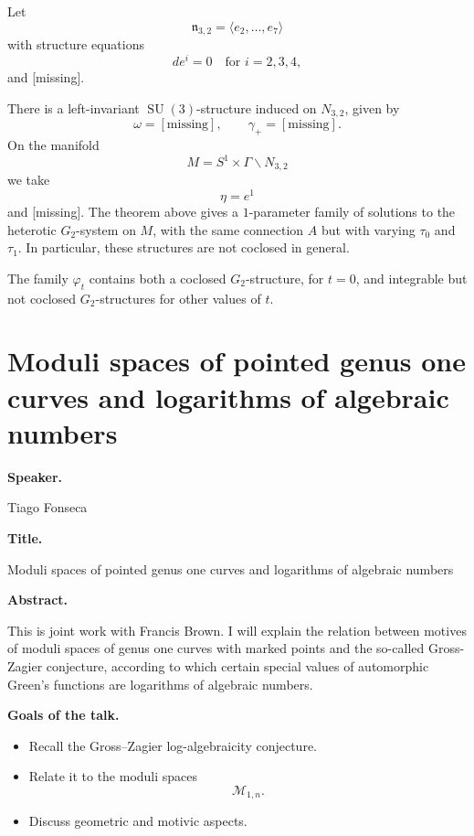 \begin{example}
\label{example-let-n2}
Let
\[
        \mathfrak n_{3,2}
        =
        \langle e_2,\ldots,e_7\rangle
\]
with structure equations
\[
        de^i=0
        \quad
        \text{for } i=2,3,4,
\]
and [missing].

There is a left-invariant
$\operatorname{SU}(3)$-structure
induced on $N_{3,2}$, given by
\[
        \omega=[\text{missing}],
        \qquad
        \gamma_+=[\text{missing}].
\]
On the manifold
\[
        M=S^1\times
        \Gamma\backslash N_{3,2}
\]
we take
\[
        \eta=e^1
\]
and [missing].
The theorem above gives a
$1$-parameter family of solutions to
the heterotic $G_2$-system on $M$,
with the same connection $A$ but with
varying $\tau_0$ and $\tau_1$.
In particular, these structures are
not coclosed in general.

The family $\varphi_t$ contains both a
coclosed $G_2$-structure, for $t=0$,
and integrable but not coclosed
$G_2$-structures for other values of
$t$.
\end{example}

\section{Moduli spaces of pointed
genus one curves and logarithms of
algebraic numbers}
\label{section-pointed-genus-one-curves-
logarithms-algebraic-numbers}

\medskip\noindent
{\bf Speaker.}

Tiago Fonseca

\medskip\noindent
{\bf Title.}

Moduli spaces of pointed genus one
curves and logarithms of algebraic
numbers

\medskip\noindent
{\bf Abstract.}

This is joint work with Francis Brown.
I will explain the relation between
motives of moduli spaces of genus one
curves with marked points and the
so-called Gross-Zagier conjecture,
according to which certain special
values of automorphic Green's
functions are logarithms of algebraic
numbers.

\medskip\noindent
{\bf Goals of the talk.}

\begin{itemize}
\item Recall the Gross--Zagier
log-algebraicity conjecture.
\item Relate it to the moduli spaces
\[
        \mathcal M_{1,n}.
\]
\item Discuss geometric and motivic
aspects.
\end{itemize}

